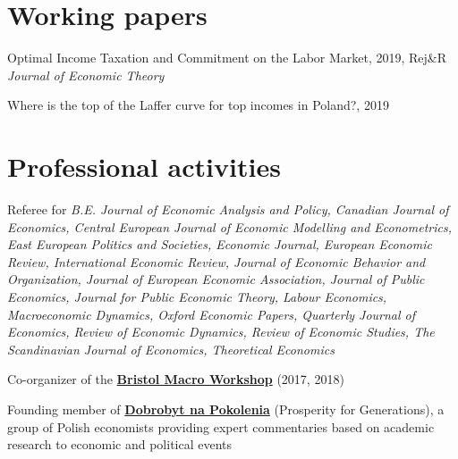 \documentclass[letterpaper]{article}
\renewenvironment{itemize}{
  \begin{list}{}{
    \setlength{\leftmargin}{1.5em}
  }
}{
  \end{list}
}
\begin{document}
\section*{Working papers}


\begin{itemize}
\item Optimal Income Taxation and Commitment on the Labor Market, 2019, Rej\&R \textit{Journal of Economic Theory}
\item Where is the top of the Laffer curve for top incomes in Poland?, 2019
\end{itemize}



\section*{Professional activities}
\begin{itemize}
\item Referee for \textit{B.E. Journal of Economic Analysis and Policy, Canadian Journal of Economics, Central European Journal of Economic Modelling and Econometrics, East European Politics and Societies, Economic Journal, European Economic Review, International Economic Review, Journal of Economic Behavior and Organization, Journal of European Economic Association, Journal of Public Economics, Journal for Public Economic Theory, Labour Economics, Macroeconomic Dynamics, Oxford Economic Papers, Quarterly Journal of Economics, Review of Economic Dynamics, Review of Economic Studies, The Scandinavian Journal of Economics, Theoretical Economics}

\item Co-organizer of the \href{http://pdoligalski.github.io/BristolMacro/index.html}{\textbf{Bristol Macro Workshop}} (2017, 2018)
\item Founding member of \href{https://napokolenia.pl}{\textbf{Dobrobyt na Pokolenia}} (Prosperity for Generations), a group of Polish economists providing expert commentaries based on academic research
 to economic and political events 
\end{itemize}
\end{document}
